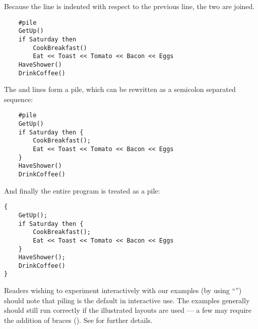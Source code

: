 Because the line  is indented with respect to the
previous line, the two are joined.

\begin{small}
\begin{verbatim}
    #pile
    GetUp()
    if Saturday then
        CookBreakfast()
        Eat << Toast << Tomato << Bacon << Eggs
    HaveShower()
    DrinkCoffee()
\end{verbatim}
\end{small}

The  and  lines form a pile,
which can be rewritten as a semicolon separated sequence:

\begin{small}
\begin{verbatim}
    #pile
    GetUp()
    if Saturday then {
        CookBreakfast();
        Eat << Toast << Tomato << Bacon << Eggs
    }
    HaveShower()
    DrinkCoffee()
\end{verbatim}
\end{small}

And finally the entire program is treated as a pile:

\begin{small}
\begin{verbatim}
{
    GetUp();
    if Saturday then {
        CookBreakfast();
        Eat << Toast << Tomato << Bacon << Eggs
    }
    HaveShower();
    DrinkCoffee()
}
\end{verbatim}
\end{small}

Readers wishing to experiment interactively with our examples
(by using ``'') should note that piling is
the default in interactive use.  The examples generally should
still run correctly if the illustrated layouts are used --- a
few may require the addition of braces (\ttin{\{ \}}).  See
 for further details.
